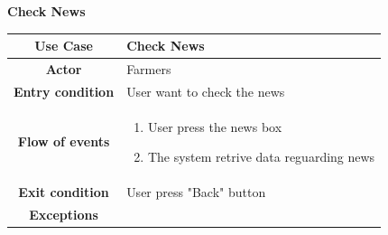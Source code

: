\documentclass[table, 12pt]{article}
\begin{document}
\begin{itemize}
            \begin{table}[H]
                \item[] \textbf{Check News}
                \item[] 
                \centering
                \begin{tabular}{|c |m{}|}
                    \hline
                    \textbf{Use Case} & Check News\\ \hline
                    \textbf{Actor} & Farmers\\ \hline
                    \textbf{Entry condition} & User want to check the news\\  \hline
                    \textbf{Flow of events} & \begin{enumerate}
                                                \item User press the news box
                                                \item The system retrive data reguarding news 
                                            \end{enumerate}\\ \hline
                    \textbf{Exit condition} & User press "Back" button\\ \hline
                    \textbf{Exceptions} &  \\ \hline                    
                \end{tabular}
            \end{table}


\end{itemize}
\end{document}
